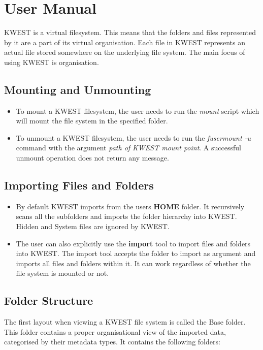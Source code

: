 \chapter{User Manual}

KWEST is a virtual filesystem. This means that the folders and files represented by it are a part of its virtual organisation. Each file in KWEST represents an actual file stored somewhere on the underlying file system. The main focus of using KWEST is organisation.

\section{Mounting and Unmounting}

\begin{itemize}
\item To mount a KWEST filesystem, the user needs to run the \textit{mount} script which will mount the file system in the specified folder. 
\item To unmount a KWEST filesystem, the user needs to run the \textit{fusermount -u} command with the argument \textit{path of KWEST mount point}. A successful unmount operation does not return any message.
\end{itemize}

\section{Importing Files and Folders}

\begin{itemize}
\item By default KWEST imports from the users \textbf{HOME} folder. It recursively scans all the subfolders and imports the folder hierarchy into KWEST. Hidden and System files are ignored by KWEST.
\item The user can also explicitly use the \textbf{import} tool to import files and folders into KWEST. The import tool accepts the folder to import as argument and imports all files and folders within it. It can work regardless of whether the file system is mounted or not.
\end{itemize}

\section{Folder Structure}

The first layout when viewing a KWEST file system is called the Base folder. This folder contains a proper organisational view of the imported data, categorised by their metadata types. It contains the following folders:

